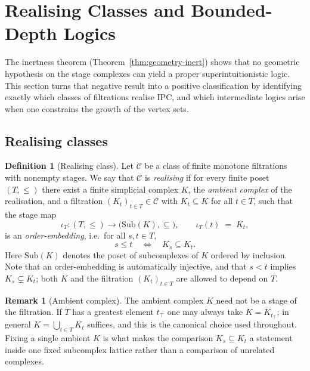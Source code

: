 \documentclass[final,12pt]{elsarticle}
\theoremstyle{plain}
\theoremstyle{definition}
\newtheorem{defi}[thm]{Definition}
\newtheorem{rem}[thm]{Remark}
\begin{document}
\section{Realising Classes and Bounded-Depth Logics}
\label{sec:nogo}

The inertness theorem (Theorem~\ref{thm:geometry-inert}) shows that no
geometric hypothesis on the stage complexes can yield a proper
superintuitionistic logic.  This section turns that negative result into a
positive classification by identifying exactly which classes of filtrations
realise IPC, and which intermediate logics arise when one constrains the
growth of the vertex sets.

\subsection{Realising classes}

\begin{defi}[Realising class]
\label{def:realising-class}
Let \(\mathcal{C}\) be a class of finite monotone filtrations with nonempty
stages.  We say that \(\mathcal{C}\) is \emph{realising} if for every finite
poset \((T,\le)\) there exist a finite simplicial complex \(K\),  the
\emph{ambient complex} of the realisation,  and a filtration
\((K_t)_{t\in T}\in\mathcal{C}\) with \(K_t\subseteq K\) for all \(t\in T\),
such that the stage map
\[
  \iota_T\colon (T,\le)\longrightarrow\bigl(\mathrm{Sub}(K),\subseteq\bigr),
  \qquad
  \iota_T(t)\;=\;K_t ,
\]
is an \emph{order-embedding}, i.e.\ for all \(s,t\in T\),
\[
  s\le t \quad\Longleftrightarrow\quad K_s\subseteq K_t .
\]
Here \(\mathrm{Sub}(K)\) denotes the poset of subcomplexes of \(K\) ordered by
inclusion.  Note that an order-embedding is automatically injective, and that
\(s<t\) implies \(K_s\subsetneq K_t\); both \(K\) and the filtration
\((K_t)_{t\in T}\) are allowed to depend on \(T\).
\end{defi}

\begin{rem}[Ambient complex]
\label{rem:ambient-complex}
The ambient complex \(K\) need not be a stage of the filtration.  If \(T\) has a
greatest element \(t_{\top}\) one may always take \(K=K_{t_{\top}}\); in general
\(K=\bigcup_{t\in T}K_t\) suffices, and this is the canonical choice used
throughout.  Fixing a single ambient \(K\) is what makes the comparison
\(K_s\subseteq K_t\) a statement inside one fixed subcomplex lattice rather than
a comparison of unrelated complexes.
\end{rem}
\end{document}

